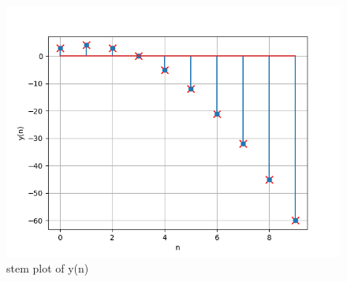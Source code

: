 \documentclass[a4,12pt,onecolumn]{IEEEtran}
\begin{document}
\begin{figure}[ht!]
\includegraphics[width=\columnwidth]{figs/main.png}
\caption{\large{stem plot of y(n)}}
\end{figure}
\end{document}
